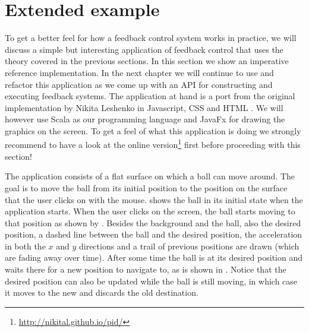 \section{Extended example}
\label{sec:imperative-balltracker}
To get a better feel for how a feedback control system works in practice, we will discuss a simple but interesting application of feedback control that uses the theory covered in the previous sections. In this section we show an imperative reference implementation. In the next chapter we will continue to use and refactor this application as we come up with an API for constructing and executing feedback systems. The application at hand is a port from the original implementation by Nikita Leshenko in Javascript, CSS and HTML \cite{nikital-balltracker}. We will however use Scala as our programming language and JavaFx for drawing the graphics on the screen. To get a feel of what this application is doing we strongly recommend to have a look at the online version\footnote{\url{http://nikital.github.io/pid/}} first before proceeding with this section!

The application consists of a flat surface on which a ball can move around. The goal is to move the ball from its initial position to the position on the surface that the user clicks on with the mouse.  shows the ball in its initial state when the application starts. When the user clicks on the screen, the ball starts moving to that position as shown by . Besides the background and the ball, also the desired position, a dashed line between the ball and the desired position, the acceleration in both the $x$ and $y$ directions and a trail of previous positions are drawn (which are fading away over time). After some time the ball is at its desired position and waits there for a new position to navigate to, as is shown in . Notice that the desired position can also be updated while the ball is still moving, in which case it moves to the new and discards the old destination.

